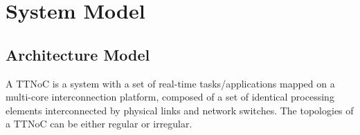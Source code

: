 \documentclass[jornal]{IEEEtran}
\begin{document}
%



\section{System Model}
\label{s:model}

\subsection{Architecture Model}
A TTNoC is a system with a set of real-time tasks/applications mapped on a multi-core interconnection platform, composed of a set of
identical processing elements interconnected by physical links and
network switches. The topologies of a TTNoC can be either regular or
irregular.
\end{document}

